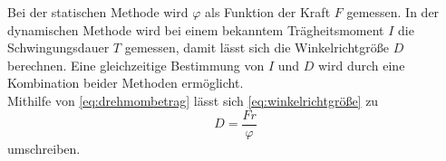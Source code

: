 Bei der statischen Methode wird $\varphi$ als Funktion der Kraft $F$ gemessen. In der dynamischen Methode wird bei einem bekanntem Trägheitsmoment $I$ die Schwingungsdauer $T$ gemessen, damit lässt sich die Winkelrichtgröße $D$ berechnen.
Eine gleichzeitige Bestimmung von $I$ und $D$ wird durch eine Kombination beider Methoden ermöglicht.\\

Mithilfe von \eqref{eq:drehmombetrag} lässt sich \eqref{eq:winkelrichtgröße} zu
\begin{equation}
  D = \frac{F r}{\varphi}
  \label{eq:WinkelrichtgröFr}
\end{equation}
umschreiben. 
